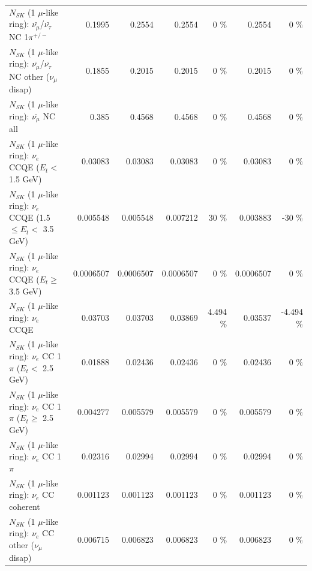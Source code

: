 \begin{table}
\begin{tabular}{| l | r | r | r  r | r  r |}
\hline
  $N_{SK}$ (1 $\mu$-like ring): $\bar{\nu_\mu}$/$\bar{\nu_\tau}$ NC 1$\pi^{+/-}$ &          0.1995 &          0.2554 &          0.2554 &        0 \%  &          0.2554 &        0 \%  \\ 
$N_{SK}$ (1 $\mu$-like ring): $\bar{\nu_\mu}$/$\bar{\nu_\tau}$ NC other ($\nu_\mu$ disap) &          0.1855 &          0.2015 &          0.2015 &        0 \%  &          0.2015 &        0 \%  \\ 
                          $N_{SK}$ (1 $\mu$-like ring): $\bar{\nu_{\mu}}$ NC all &           0.385 &          0.4568 &          0.4568 &        0 \%  &          0.4568 &        0 \%  \\ 
\hline
\hline
\hline
                  $N_{SK}$ (1 $\mu$-like ring): $\nu_e$ CCQE ($E_{t} <$ 1.5 GeV) &         0.03083 &         0.03083 &         0.03083 &        0 \%  &         0.03083 &        0 \%  \\ 
         $N_{SK}$ (1 $\mu$-like ring): $\nu_e$ CCQE (1.5 $\leq E_{t} <$ 3.5 GeV) &        0.005548 &        0.005548 &        0.007212 &       30 \%  &        0.003883 &      -30 \%  \\ 
               $N_{SK}$ (1 $\mu$-like ring): $\nu_e$ CCQE ($E_{t} \geq$ 3.5 GeV) &       0.0006507 &       0.0006507 &       0.0006507 &        0 \%  &       0.0006507 &        0 \%  \\ 
\hline
                                      $N_{SK}$ (1 $\mu$-like ring): $\nu_e$ CCQE &         0.03703 &         0.03703 &         0.03869 &    4.494 \%  &         0.03537 &   -4.494 \%  \\ 
\hline
             $N_{SK}$ (1 $\mu$-like ring): $\nu_e$ CC 1$\pi$ ($E_{t} <$ 2.5 GeV) &         0.01888 &         0.02436 &         0.02436 &        0 \%  &         0.02436 &        0 \%  \\ 
          $N_{SK}$ (1 $\mu$-like ring): $\nu_e$ CC 1$\pi$ ($E_{t} \geq$ 2.5 GeV) &        0.004277 &        0.005579 &        0.005579 &        0 \%  &        0.005579 &        0 \%  \\ 
\hline
                                 $N_{SK}$ (1 $\mu$-like ring): $\nu_e$ CC 1$\pi$ &         0.02316 &         0.02994 &         0.02994 &        0 \%  &         0.02994 &        0 \%  \\ 
                               $N_{SK}$ (1 $\mu$-like ring): $\nu_e$ CC coherent &        0.001123 &        0.001123 &        0.001123 &        0 \%  &        0.001123 &        0 \%  \\ 
                $N_{SK}$ (1 $\mu$-like ring): $\nu_e$ CC other ($\nu_\mu$ disap) &        0.006715 &        0.006823 &        0.006823 &        0 \%  &        0.006823 &        0 \%  \\ 

\end{tabular}
\end{table}
